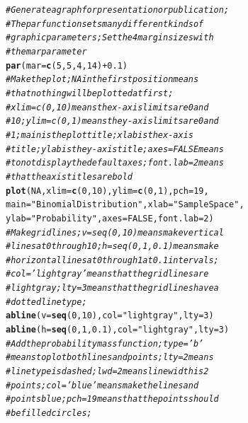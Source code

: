 \documentclass[nohyper,justified,marginals=raggedright]{tufte-book}\usepackage[]{graphicx}\usepackage[]{color}
\makeatletter
\newcommand{\hlnum}[1]{\textcolor[rgb]{0.686,0.059,0.569}{#1}}%
\newcommand{\hlstr}[1]{\textcolor[rgb]{0.192,0.494,0.8}{#1}}%
\newcommand{\hlcom}[1]{\textcolor[rgb]{0.678,0.584,0.686}{\textit{#1}}}%
\newcommand{\hlopt}[1]{\textcolor[rgb]{0,0,0}{#1}}%
\newcommand{\hlstd}[1]{\textcolor[rgb]{0.345,0.345,0.345}{#1}}%
\newcommand{\hlkwc}[1]{\textcolor[rgb]{0.333,0.667,0.333}{#1}}%
\newcommand{\hlkwd}[1]{\textcolor[rgb]{0.737,0.353,0.396}{\textbf{#1}}}%
\newenvironment{kframe}{%
 \def\at@end@of@kframe{}%
 \ifinner\ifhmode%
  \def\at@end@of@kframe{\end{minipage}}%
  \begin{minipage}{\columnwidth}%
 \fi\fi%
 \def\FrameCommand##1{\hskip\@totalleftmargin \hskip-\fboxsep
 \colorbox{shadecolor}{##1}\hskip-\fboxsep
     \hskip-\linewidth \hskip-\@totalleftmargin \hskip\columnwidth}%
 \MakeFramed {\advance\hsize-\width
   \@totalleftmargin\z@ \linewidth\hsize
   \@setminipage}}%
 {\par\unskip\endMakeFramed%
 \at@end@of@kframe}
\newenvironment{knitrout}{}{} %
\makeatother
\begin{document}
\begin{knitrout}
\color{fgcolor}\begin{kframe}
\begin{alltt}
\hlcom{# Generate a graph for presentation or publication;}
\hlcom{# The par function sets many different kinds of}
\hlcom{# graphic parameters; Set the 4 margin sizes with}
\hlcom{# the mar parameter}
\hlkwd{par}\hlstd{(}\hlkwc{mar} \hlstd{=} \hlkwd{c}\hlstd{(}\hlnum{5}\hlstd{,} \hlnum{5}\hlstd{,} \hlnum{4}\hlstd{,} \hlnum{14}\hlstd{)} \hlopt{+} \hlnum{0.1}\hlstd{)}
\hlcom{# Make the plot; NA in the first position means}
\hlcom{# that nothing will be plotted at first;}
\hlcom{# xlim=c(0,10) means the x-axis limits are 0 and}
\hlcom{# 10; ylim=c(0,1) means the y-axis limits are 0 and}
\hlcom{# 1; main is the plot title; xlab is the x-axis}
\hlcom{# title; ylab is the y-axis title; axes=FALSE means}
\hlcom{# to not display the default axes; font.lab=2 means}
\hlcom{# that the axis titles are bold}
\hlkwd{plot}\hlstd{(}\hlnum{NA}\hlstd{,} \hlkwc{xlim} \hlstd{=} \hlkwd{c}\hlstd{(}\hlnum{0}\hlstd{,} \hlnum{10}\hlstd{),} \hlkwc{ylim} \hlstd{=} \hlkwd{c}\hlstd{(}\hlnum{0}\hlstd{,} \hlnum{1}\hlstd{),} \hlkwc{pch} \hlstd{=} \hlnum{19}\hlstd{,}
    \hlkwc{main} \hlstd{=} \hlstr{"Binomial Distribution"}\hlstd{,} \hlkwc{xlab} \hlstd{=} \hlstr{"Sample Space"}\hlstd{,}
    \hlkwc{ylab} \hlstd{=} \hlstr{"Probability"}\hlstd{,} \hlkwc{axes} \hlstd{=} \hlnum{FALSE}\hlstd{,} \hlkwc{font.lab} \hlstd{=} \hlnum{2}\hlstd{)}
\hlcom{# Make gridlines; v=seq(0,10) means make vertical}
\hlcom{# lines at 0 through 10; h=seq(0,1,0.1) means make}
\hlcom{# horizontal lines at 0 through 1 at 0.1 intervals;}
\hlcom{# col='lightgray' means that the gridlines are}
\hlcom{# light gray; lty=3 means that the gridlines have a}
\hlcom{# dotted line type;}
\hlkwd{abline}\hlstd{(}\hlkwc{v} \hlstd{=} \hlkwd{seq}\hlstd{(}\hlnum{0}\hlstd{,} \hlnum{10}\hlstd{),} \hlkwc{col} \hlstd{=} \hlstr{"lightgray"}\hlstd{,} \hlkwc{lty} \hlstd{=} \hlnum{3}\hlstd{)}
\hlkwd{abline}\hlstd{(}\hlkwc{h} \hlstd{=} \hlkwd{seq}\hlstd{(}\hlnum{0}\hlstd{,} \hlnum{1}\hlstd{,} \hlnum{0.1}\hlstd{),} \hlkwc{col} \hlstd{=} \hlstr{"lightgray"}\hlstd{,} \hlkwc{lty} \hlstd{=} \hlnum{3}\hlstd{)}
\hlcom{# Add the probability mass function; type = 'b'}
\hlcom{# means to plot both lines and points; lty=2 means}
\hlcom{# line type is dashed; lwd=2 means line width is 2}
\hlcom{# points; col='blue' means make the lines and}
\hlcom{# points blue; pch=19 means that the points should}
\hlcom{# be filled circles;}

\end{alltt}
\end{kframe}
\end{knitrout}
\end{document}
